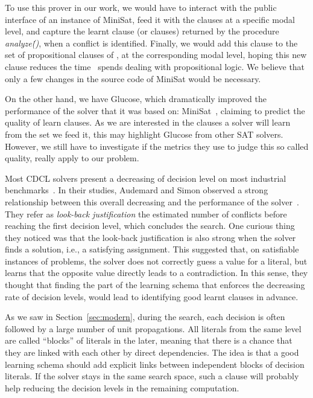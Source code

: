 To use this prover in our work, we would have to interact with the public
interface of an instance of MiniSat, feed it with the clauses at a specific
modal level, and capture the learnt clause (or clauses) returned by the
procedure \textit{analyze\.()}, when a conflict is identified. Finally, we would
add this clause to the set of propositional clauses of \ksp, at the
corresponding modal level, hoping this new clause reduces the time \ksp~spends
dealing with propositional logic. We believe that only a few changes in the
source code of MiniSat would be necessary.

On the other hand, we have Glucose, which dramatically improved the performance
of the solver that it was based on: MiniSat~\cite{glucose}, claiming to predict
the quality of learn clauses. As we are interested in the clauses a solver will
learn from the set we feed it, this may highlight Glucose from other SAT
solvers. However, we still have to investigate if the metrics they use to judge
this so called quality, really apply to our problem. 

Most CDCL solvers present a decreasing of decision level on most industrial
benchmarks~\cite{audemard2009predicting}. In their studies, Audemard and Simon
observed a strong relationship between this overall decreasing and the
performance of the solver~\cite{audemard2009predicting}. They refer as
\emph{look-back justification} the estimated number of conflicts before reaching
the first decision level, which concludes the search. One curious thing they
noticed was that the look-back justification is also strong when the solver
finds a solution, i.e., a satisfying assignment. This suggested that, on
satisfiable instances of problems, the solver does not correctly guess a value
for a literal, but learns that the opposite value directly leads to a
contradiction. In this sense, they thought that finding the part of the learning
schema that enforces the decreasing rate of decision levels, would lead to
identifying good learnt clauses in advance.

As we saw in Section~\ref{sec:modern}, during the search, each decision is often
followed by a large number of unit propagations. All literals from the same
level are called ``blocks'' of literals in the later, meaning that there is a
chance that they are linked with each other by direct dependencies. The idea is
that a good learning schema should add explicit links between independent blocks
of decision literals. If the solver stays in the same search space, such a
clause will probably help reducing the decision levels in the remaining
computation.

